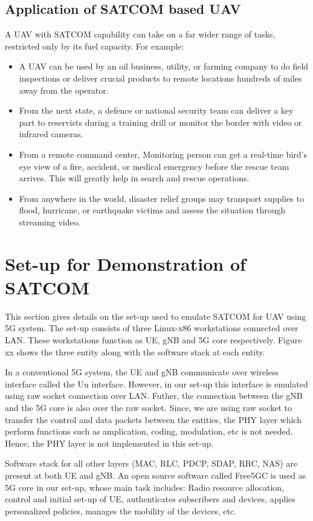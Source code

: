 \subsection{Application of SATCOM based UAV}
A UAV with SATCOM capability can take on a far wider range of tasks, restricted only by its fuel capacity. For example: 
\begin{itemize}
	\item A UAV can be used by an oil business, utility, or farming company to do field inspections or deliver crucial products to remote locations hundreds of miles away from the operator. 
	\item From the next state, a defence or national security team can deliver a key part to reservists during a training drill or monitor the border with video or infrared cameras.
	\item From a remote command center, Monitoring person can get a real-time bird's eye view of a fire, accident, or medical emergency before the rescue team arrives. This will greatly help in search and rescue operations.
	\item From anywhere in the world, disaster relief groups may transport supplies to flood, hurricane, or earthquake victims and assess the situation through streaming video.
\end{itemize}

\section{Set-up for Demonstration of SATCOM}
This section gives details on the set-up used to emulate SATCOM for UAV using 5G system. The set-up consists of three Linux-x86 workstations connected over LAN. These workstations function as UE, gNB and 5G core respectively. Figure xx shows the three entity along with the software stack at each entity.



In a conventional 5G system, the UE and gNB  communicate over wireless interface called the Uu interface. However, in our set-up this interface is emulated using raw socket connection over LAN. Futher, the connection between the gNB and the 5G core is also over the raw socket. Since, we are using raw socket to transfer the control and data packets between the entities, the PHY layer which perform functions such as amplication, coding, modulation, etc is not needed. Hence, the PHY layer is not implemented in this set-up.

Software stack for all other layers (MAC, RLC, PDCP, SDAP, RRC, NAS) are present at both UE and gNB. An open source software called Free5GC is used as 5G core in our set-up, whose main task includes: Radio resource allocation, control and initial set-up of UE, authenticates subscribers and devices, applies personalized policies, manages the mobility of the devices, etc.

